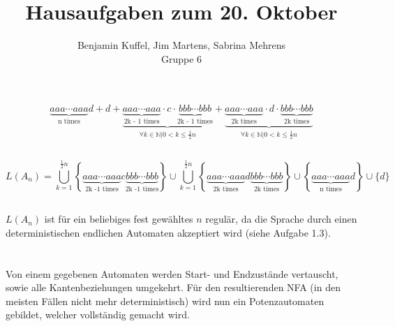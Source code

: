 \documentclass[10pt,a4paper,oneside,ngerman,numbers=noenddot]{scrartcl}
\begin{document}
\author{Benjamin Kuffel, Jim Martens, Sabrina Mehrens\\Gruppe 6}
\title{Hausaufgaben zum 20. Oktober}
\maketitle

\setcounter{section}{2}
\section{} %
	\subsection{} %
	\[\underbrace{aaa \cdots aaa}_{\text{n times}}d + d + \underbrace{\underbrace{aaa \cdots aaa}_{\text{2k - 1 times}} \cdot c \cdot \underbrace{bbb \cdots bbb}_{\text{2k - 1 times}}}_{\forall k \in \mathbb{N}| 0 < k \leq \frac{1}{2}n} + \underbrace{\underbrace{aaa \cdots aaa}_{\text{2k times}} \cdot d \cdot \underbrace{bbb \cdots bbb}_{\text{2k times}}}_{\forall k \in \mathbb{N}| 0 < k \leq \frac{1}{2}n}\]
	\subsection{}
	\[L(A_{n}) = \bigcup\limits_{k = 1}^{\frac{1}{2}n} \left\lbrace \underbrace{aaa \cdots aaa}_{\text{2k -1 times}} c \underbrace{bbb \cdots bbb}_{\text{2k -1 times}}\right\rbrace \cup \bigcup\limits_{k = 1}^{\frac{1}{2}n} \left\lbrace \underbrace{aaa \cdots aaa}_{\text{2k times}} d \underbrace{bbb \cdots bbb}_{\text{2k times}}\right\rbrace \cup \left\lbrace \underbrace{aaa \cdots aaa}_{\text{n times}}d\right\rbrace \cup \{d\}\]
	\subsection{}
	\subsection{}
	\(L(A_{n})\) ist für ein beliebiges fest gewähltes \(n\) regulär, da die Sprache durch einen deterministischen endlichen Automaten akzeptiert wird (siehe Aufgabe 1.3).
\section{} %
\label{sec:14}
	\subsection{}
	Von einem gegebenen Automaten werden Start- und Endzustände vertauscht, sowie alle Kantenbeziehungen umgekehrt. Für den resultierenden NFA (in den meisten Fällen nicht mehr deterministisch) wird nun ein Potenzautomaten gebildet, welcher vollständig gemacht wird.
\end{document}

